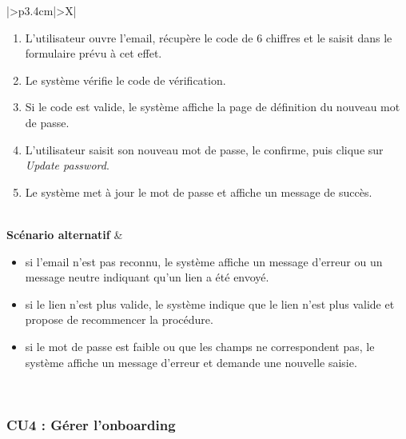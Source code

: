 \documentclass[a4paper,12pt]{report}
\begin{document}
\begin{table}[H]
\begin{tabularx}{\textwidth}{|>{\RaggedRight\arraybackslash}p{3.4cm}|>{\RaggedRight\arraybackslash}X|}
\begin{minipage}[t]{\linewidth}
\begin{enumerate}[leftmargin=*, topsep=0pt, itemsep=1pt]
    \item L'utilisateur ouvre l'email, récupère le code de 6 chiffres et le saisit dans le formulaire prévu à cet effet.
    \item Le système vérifie le code de vérification.
    \item Si le code est valide, le système affiche la page de définition du nouveau mot de passe.
    \item L'utilisateur saisit son nouveau mot de passe, le confirme, puis clique sur \textit{Update password}.
    \item Le système met à jour le mot de passe et affiche un message de succès.
\end{enumerate}
\vspace{2pt}
\end{minipage} \\
\hline
\textbf{Scénario alternatif} &
\begin{minipage}[t]{\linewidth}
\vspace{2pt}
\begin{itemize}[leftmargin=*, topsep=0pt, itemsep=1pt]
    \item si l'email n'est pas reconnu, le système affiche un message d'erreur ou un message neutre indiquant qu'un lien a été envoyé.
    \item si le lien n'est plus valide, le système indique que le lien n'est plus valide et propose de recommencer la procédure.
    \item si le mot de passe est faible ou que les champs ne correspondent pas, le système affiche un message d'erreur et demande une nouvelle saisie.
\end{itemize}
\vspace{2pt}
\end{minipage} \\
\hline
\end{tabularx}
\fussy
\end{table}

\subsubsection*{CU4 : Gérer l’onboarding}
\end{document}
